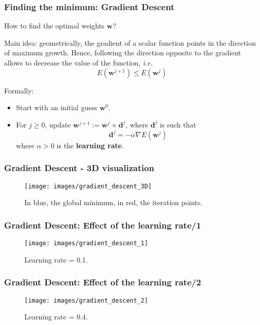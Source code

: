 \documentclass{beamer}
\begin{document}
	\begin{frame}
		\frametitle{Finding the minimum: Gradient Descent}
		How to find the optimal weights $\bm{w}$?
		
		\vspace{5mm}
		
		Main idea: geometrically, the gradient of a scalar function points in the direction of maximum growth. Hence, following the direction opposite to the gradient allows to decrease the value of the function, \textit{i.e.}
		\begin{equation*}
			E(\bm{w}^{j+1}) \leq E(\bm{w}^j) 
		\end{equation*}
		
		\vspace{5mm}
		
		Formally:
		\begin{itemize}
			\item Start with an initial guess $\bm{w}^0$.
			\item For $j \geq 0$, update $\bm{w}^{j+1} := \bm{w}^{j} + \bm{d}^j$, where $\bm{d}^j$ is such that
			$$\bm{d}^j = - \alpha \nabla E(\bm{w}^j)$$
			where $\alpha>0$ is the \textbf{learning rate}.
		\end{itemize}
	
	\end{frame}

	\begin{frame}
		\frametitle{Gradient Descent - 3D visualization}
		\begin{figure}
			\centering
			\texttt{[image: images/gradient\_descent\_3D]}
			\caption{In blue, the global minimum, in red, the iteration points.}
		\end{figure}
	\end{frame}

	\begin{frame}
		\frametitle{Gradient Descent: Effect of the learning rate/1}
		\begin{figure}
			\centering
			\texttt{[image: images/gradient\_descent\_1]}
			\caption{Learning rate = 0.1.}
		\end{figure}
	\end{frame}

	\begin{frame}
		\frametitle{Gradient Descent: Effect of the learning rate/2}
		\begin{figure}
			\centering
			\texttt{[image: images/gradient\_descent\_2]}
			\caption{Learning rate = 0.4.}
		\end{figure}
	\end{frame}
\end{document}
